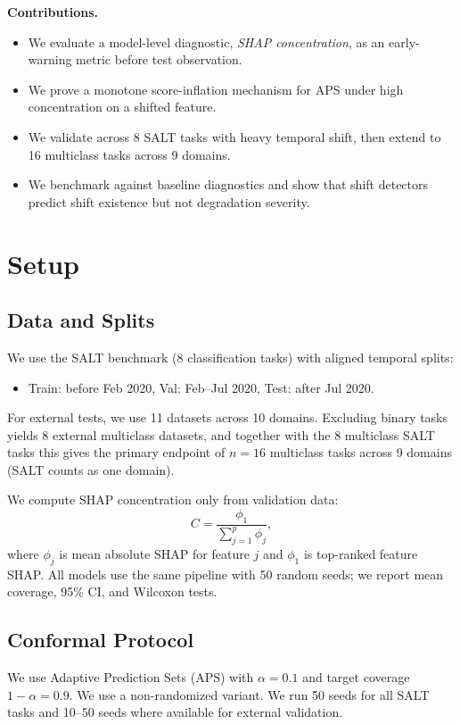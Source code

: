\documentclass[sigconf,anonymous]{acmart}
\begin{document}
\textbf{Contributions.}
\begin{itemize}
  \item We evaluate a model-level diagnostic, \textit{SHAP concentration}, as an early-warning metric before test observation.
  \item We prove a monotone score-inflation mechanism for APS under high concentration on a shifted feature.
  \item We validate across 8 SALT tasks with heavy temporal shift, then extend to 16 multiclass tasks across 9 domains.
  \item We benchmark against baseline diagnostics and show that shift detectors predict shift existence but not degradation severity.
\end{itemize}

\section{Setup}
\subsection{Data and Splits}
We use the SALT benchmark (8 classification tasks) with aligned temporal splits:
\begin{itemize}
  \item Train: before Feb 2020, Val: Feb--Jul 2020, Test: after Jul 2020.
\end{itemize}
For external tests, we use 11 datasets across 10 domains. Excluding binary tasks yields 8 external multiclass datasets, and together with the 8 multiclass SALT tasks this gives the primary endpoint of $n=16$ multiclass tasks across 9 domains (SALT counts as one domain).

We compute SHAP concentration only from validation data:
\begin{equation}
  C = \frac{\phi_1}{\sum_{j=1}^{p} \phi_j},
\end{equation}
where $\phi_j$ is mean absolute SHAP for feature $j$ and $\phi_1$ is top-ranked feature SHAP. All models use the same pipeline with 50 random seeds; we report mean coverage, 95\% CI, and Wilcoxon tests.

\subsection{Conformal Protocol}
We use Adaptive Prediction Sets (APS) with $\alpha=0.1$ and target coverage $1-\alpha=0.9$. We use a non-randomized variant. We run 50 seeds for all SALT tasks and 10--50 seeds where available for external validation.
\end{document}
